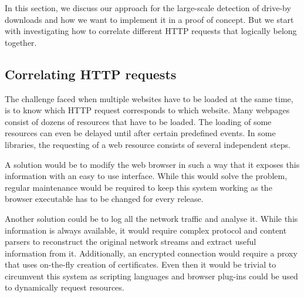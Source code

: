 In this section, we discuss our approach for the large-scale detection of drive-by downloads and how we want to implement it in a proof of concept. But we start with investigating how to correlate different HTTP requests that logically belong together.

\subsection{Correlating HTTP requests}
\label{sigh}

The challenge faced when multiple websites have to be loaded at the same time, is to know which HTTP request corresponds to which website. Many webpages consist of dozens of resources that have to be loaded. The loading of some resources can even be delayed until after certain predefined events. In some libraries, the requesting of a web resource consists of several independent steps.

A solution would be to modify the web browser in such a way that it exposes this information with an easy to use interface. While this would solve the problem, regular maintenance would be required to keep this system working as the browser executable has to be changed for every release.

Another solution could be to log all the network traffic and analyse it. While this information is always available, it would require complex protocol and content parsers to reconstruct the original network streams and extract useful information from it. Additionally, an encrypted connection would require a proxy that uses on-the-fly creation of certificates. Even then it would be trivial to circumvent this system as scripting languages and browser plug-ins could be used to dynamically request resources.


